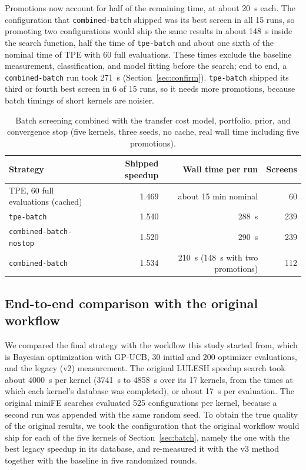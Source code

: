 \documentclass[10pt]{article}
\newcommand{\code}[1]{\texttt{#1}}
\begin{document}
Promotions now account for half of the remaining time, at about 20~s each. The
configuration that \code{combined-batch} shipped was its best screen in all 15
runs, so promoting two configurations would ship the same results in about
148~s inside the search function, half the time of \code{tpe-batch} and about
one sixth of the nominal time of TPE with 60 full evaluations. These times
exclude the baseline measurement, classification, and model fitting before
the search; end to end, a \code{combined-batch} run took 271~s
(Section~\ref{sec:confirm}). \code{tpe-batch} shipped its third
or fourth best screen in 6 of 15 runs, so it needs more promotions, because
batch timings of short kernels are noisier.

\begin{table}[t]
\centering
\caption{Batch screening combined with the transfer cost model, portfolio,
prior, and convergence stop (five kernels, three seeds, no cache, real wall
time including five promotions).}
\label{tab:combinedbatch}
\small
\begin{tabular}{lrrr}
\toprule
Strategy & Shipped speedup & Wall time per run & Screens \\
\midrule
TPE, 60 full evaluations (cached) & 1.469 & about 15 min nominal & 60 \\
\code{tpe-batch} & 1.540 & 288~s & 239 \\
\code{combined-batch-nostop} & 1.520 & 290~s & 239 \\
\code{combined-batch} & 1.534 & 210~s (148~s with two promotions) & 112 \\
\bottomrule
\end{tabular}
\end{table}


\subsection{End-to-end comparison with the original workflow}
\label{sec:endtoend}
We compared the final strategy with the workflow this study started from,
which is Bayesian optimization with GP-UCB, 30 initial and 200 optimizer
evaluations, and the legacy (v2) measurement. The original LULESH speedup
search took about 4000~s per kernel (3741~s to 4858~s over its 17 kernels,
from the times at which each kernel's database was completed), or about 17~s
per evaluation. The original miniFE searches evaluated 525 configurations per
kernel, because a second run was appended with the same random seed. To obtain
the true quality of the original results, we took the configuration that the
original workflow would ship for each of the five kernels of
Section~\ref{sec:batch}, namely the one with the best legacy speedup in its
database, and re-measured it with the v3 method together with the baseline in
five randomized rounds.
\end{document}
